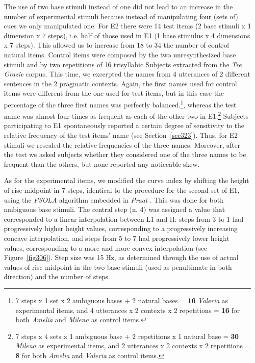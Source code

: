 The use of two base stimuli instead of one did not lead to an increase in the number of experimental stimuli because instead of manipulating four (sets of) cues we only manipulated one. For E2 there were 14 test items (2 base stimuli x 1 dimension x 7 steps), i.e. half of those used in E1 (1 base stimulus x 4 dimensions x 7 steps). This allowed us to increase from 18 to 34 the number of control natural items. Control items were composed by the two unresynthesized base stimuli and by two repetitions of 16 trisyllabic Subjects extracted from the \textit{Tre Grazie} corpus. This time, we excerpted the names from 4 utterances of 2 different sentences in the 2 pragmatic contexts. Again, the first names used for control items were different from the one used for test items, but in this case the percentage of the three first names was perfectly balanced.\footnote{7 steps x 1 set x 2 ambiguous bases + 2 natural bases = \textbf{16} \textit{Valeria} as experimental items, and 4 utterances x 2 contexts x 2 repetitions = \textbf{16} for both \textit{Amelia} and \textit{Milena} as control items.}, whereas the test name was almost four times as frequent as each of the other two in E1.\footnote{7 steps x 4 sets x 1 ambiguous base + 2 repetitions x 1 natural base = \textbf{30} \textit{Milena} as experimental items, and 2 utterances x 2 contexts x 2 repetitions = \textbf{8} for both \textit{Amelia} and \textit{Valeria} as control items.} Subjects participating to E1 spontaneously reported a certain degree of sensitivity to the relative frequency of the test items' name (see Section~\ref{sec323}). Thus, for E2 stimuli we rescaled the relative frequencies of the three names. Moreover, after the test we asked subjects whether they considered one of the three names to be frequent than the others, but none reported any noticeable skew.

As for the experimental items, we modified the curve index by shifting the height of rise midpoint in 7 steps, identical to the procedure for the second set of E1, using the \textit{PSOLA} algorithm \citep{moulines1990pitchsyncronous} embedded in \textit{Praat} \citep{boersma2008praat}. This was done for both ambiguous base stimuli. The central step (n. 4) was assigned a value that corresponded to a linear interpolation between L1 and H; steps from 3 to 1 had progressively higher height values, corresponding to a progressively increasing concave interpolation, and steps from 5 to 7 had progressively lower height values, corresponding to a more and more convex interpolation (see Figure~\ref{fig306}). Step size was 15 Hz, as determined through the use of actual values of rise midpoint in the two base stimuli (used as penultimate in both direction) and the number of steps.

